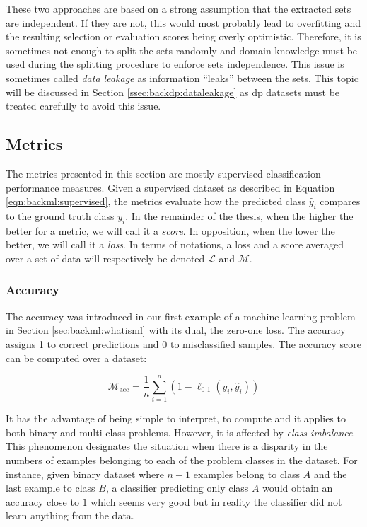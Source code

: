 These two approaches are based on a strong assumption that the extracted sets are
independent. If they are not, this would most probably lead to overfitting and
the resulting selection or evaluation scores being overly optimistic. Therefore,
it is sometimes not enough to split the sets randomly and domain knowledge must
be used during the splitting procedure to enforce sets independence. This issue
is sometimes called \textit{data leakage} \cite{kaufman2012leakage} as
information ``leaks'' between the sets. This topic will be discussed in Section
\ref{ssec:backdp:dataleakage} as \acrlong{dp} datasets must be treated carefully 
to avoid this issue.

\subsection{Metrics}
\label{ssec:backml:metrics}

The metrics presented in this section are mostly supervised classification
performance measures. Given a supervised dataset as described in Equation
\ref{eqn:backml:supervised}, the metrics evaluate how the predicted class $\hat{y}_i$
compares to the ground truth class $y_i$. In the remainder of the thesis, when
the higher the better for a metric, we will call it a \textit{score}. In opposition,
when the lower the better, we will call it a \textit{loss}. In terms of notations,
a loss and a score averaged over a set of data will respectively be denoted
$\mathcal{L}$ and $\mathcal{M}$.

\subsubsection{Accuracy}
\label{sssec:backml:metric:acc}
The accuracy was introduced in our first example of a machine learning problem in
Section \ref{sec:backml:whatisml} with its dual, the zero-one loss. The accuracy
assigns 1 to correct predictions and 0 to misclassified samples. The accuracy
score can be computed over a dataset:

\begin{equation}
\label{eqn:backml:accuracy}
\mathcal{M}_{\text{acc}} = \dfrac{1}{n} \sum\limits_{i = 1}^n (1 - \ell_{\text{0-1}}(y_i, \hat{y}_i))
\end{equation}

It has the advantage of being simple to interpret, to compute and it applies to
both binary and multi-class problems. However, it is affected by \textit{class imbalance}.
This phenomenon designates the situation when there is a disparity in the numbers
of examples belonging to each of the problem classes in the dataset. For instance,
given binary dataset where $n-1$ examples belong to class $A$ and the last example
to class $B$, a classifier predicting only class $A$ would obtain an accuracy
close to $1$ which seems very good but in reality the classifier did not learn
anything from the data.

